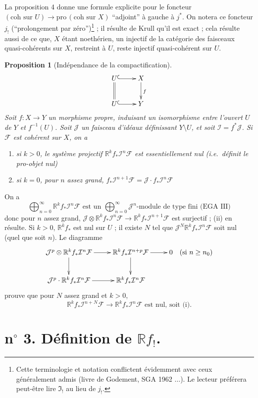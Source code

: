 \documentclass[12pt]{amsart}
\theoremstyle{plain}
\newtheorem{prop}{Proposition}[section]
\theoremstyle{definition}
\newcommand{\Pro}{\text{pro}\,}
\newcommand{\cF}{\mathcal{F}}
\newcommand{\cI}{\mathcal{I}}
\newcommand{\cJ}{\mathcal{J}}
\newcommand{\bR}{\mathbb{R}}
\begin{document}
La proposition 4 donne une formule explicite pour le foncteur $(\text{coh sur } U) \to \Pro(\text{coh sur } X)$ ``adjoint'' \`a gauche \`a $j^{*}$. On notera ce foncteur $j_{!}$ (``prolongement par z\'ero'')\footnote{Cette terminologie et notation conflictent \'evidemment avec ceux g\'en\'eralement admis (livre de Godement, SGA 1962 $\ldots$). Le lecteur pr\'ef\'erera peut-\^etre lire $\mathfrak{I}_{!}$ au lieu de $j_{!}$.} ; il r\'esulte de Krull qu'il est exact ; cela r\'esulte aussi de ce que, $X$ \'etant noeth\'erien, un injectif de la cat\'egorie des faisceaux quasi-coh\'erents sur $X$, restreint \`a $U$, reste injectif quasi-coh\'erent sur $U$.

\begin{prop}[Ind\'ependance de la compactification]
\[
\xymatrix{
U \ar@{^{(}->}[r] \ar@{=}[d] & X \ar[d]^{f} \\
U \ar@{^{(}->}[r] & Y
}
\]
Soit $f: X \to Y$ un morphisme propre, induisant un isomorphisme entre l'ouvert $U$ de $Y$ et $f^{-1}(U)$. Soit $\cJ$ un faisceau d'id\'eaux d\'efinissant $Y \setminus U$, et soit $\cI = f^{*}\cJ$. Si $\cF$ est coh\'erent sur $X$, on a
\begin{enumerate}
\item[(i)] si $k > 0$, le syst\`eme projectif $\bR^{k}f_{*}\cI^{n}\cF$ est essentiellement nul (i.e.\ d\'efinit le pro-objet nul)
\item[(ii)] si $k = 0$, pour $n$ assez grand, $f_{*}\cI^{n+1}\cF = \cJ \cdot f_{*}\cI^{n}\cF$
\end{enumerate}
\end{prop}

On a
\[
\bigoplus_{n=0}^{\infty} \bR^{k}f_{*}\cI^{n}\cF \text{ est un } \bigoplus_{n=0}^{\infty} \cJ^{n}\text{-module de type fini (EGA III)}
\]
donc pour $n$ assez grand, $\cJ \otimes \bR^{k}f_{*}\cI^{n}\cF \to \bR^{k}f_{*}\cI^{n+1}\cF$ est surjectif ; (ii) en r\'esulte. Si $k > 0$, $\bR^{k}f_{*}$ est nul sur $U$ ; il existe $N$ tel que $\cJ^{N}\bR^{k}f_{*}\cI^{n}\cF$ soit nul (quel que soit $n$). Le diagramme
\[
\xymatrix{
\cJ^{p} \otimes \bR^{k}f_{*}\cI^{n}\cF \ar[r] \ar[d] & \bR^{k}f_{*}\cI^{n+p}\cF \ar[r] \ar[d] & 0 \quad (\text{si } n \geq n_{0}) \\
\cJ^{p} \cdot \bR^{k}f_{*}\cI^{n}\cF \ar[r] & \bR^{k}f_{*}\cI^{n}\cF
}
\]
prouve que pour $N$ assez grand et $k > 0$,
\[
\bR^{k}f_{*}\cI^{n+N}\cF \to \bR^{k}f_{*}\cI^{n}\cF \text{ est nul, soit (i).}
\]

\section*{n$^{\circ}$ 3. D\'efinition de $\bR f_{!}$.}
\end{document}
